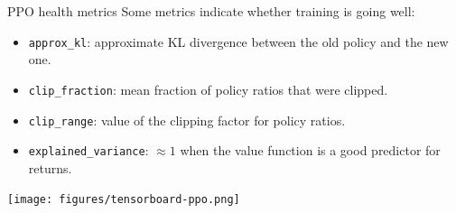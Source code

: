 \documentclass[10pt, aspectratio=1610]{beamer}
\begin{document}
\begin{frame}{PPO health metrics}
    Some metrics indicate whether training is going well:
    \begin{itemize}
        \item \texttt{approx_kl}: approximate KL divergence between the old policy and the new one.
        \item \texttt{clip_fraction}: mean fraction of policy ratios that were clipped.
        \item \texttt{clip_range}: value of the clipping factor for policy ratios.
        \item \texttt{explained_variance}: $\approx 1$ when the value function is a good predictor for returns.
    \end{itemize}

    \begin{adjustbox}{height=12em, keepaspectratio, center}
        \texttt{[image: figures/tensorboard-ppo.png]}
    \end{adjustbox}
\end{frame}
\end{document}
